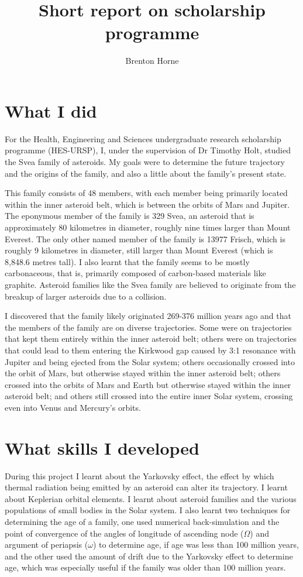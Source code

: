 \documentclass[12pt,a4paper,openright]{article}
\title{Short report on scholarship programme}
\author{Brenton Horne}
\begin{document}
\maketitle

\section{What I did}
For the Health, Engineering and Sciences undergraduate research scholarship programme (HES-URSP), I, under the supervision of Dr Timothy Holt, studied the Svea family of asteroids. My goals were to determine the future trajectory and the origins of the family, and also a little about the family's present state. 

This family consists of 48 members, with each member being primarily located within the inner asteroid belt, which is between the orbits of Mars and Jupiter. The eponymous member of the family is 329 Svea, an asteroid that is approximately 80 kilometres in diameter, roughly nine times larger than Mount Everest. The only other named member of the family is 13977 Frisch, which is roughly 9 kilometres in diameter, still larger than Mount Everest (which is 8,848.6 metres tall). I also learnt that the family seems to be mostly carbonaceous, that is, primarily composed of carbon-based materials like graphite. Asteroid families like the Svea family are believed to originate from the breakup of larger asteroids due to a collision. 

I discovered that the family likely originated 269-376 million years ago and that the members of the family are on diverse trajectories. Some were on trajectories that kept them entirely within the inner asteroid belt; others were on trajectories that could lead to them entering the Kirkwood gap caused by 3:1 resonance with Jupiter and being ejected from the Solar system; others occasionally crossed into the orbit of Mars, but otherwise stayed within the inner asteroid belt; others crossed into the orbits of Mars and Earth but otherwise stayed within the inner asteroid belt; and others still crossed into the entire inner Solar system, crossing even into Venus and Mercury's orbits. 

\section{What skills I developed}
During this project I learnt about the Yarkovsky effect, the effect by which thermal radiation being emitted by an asteroid can alter its trajectory. I learnt about Keplerian orbital elements. I learnt about asteroid families and the various populations of small bodies in the Solar system. I also learnt two techniques for determining the age of a family, one used numerical back-simulation and the point of convergence of the angles of longitude of ascending node ($\Omega$) and argument of periapsis ($\omega$) to determine age, if age was less than 100 million years, and the other used the amount of drift due to the Yarkovsky effect to determine age, which was especially useful if the family was older than 100 million years. 
\end{document}
